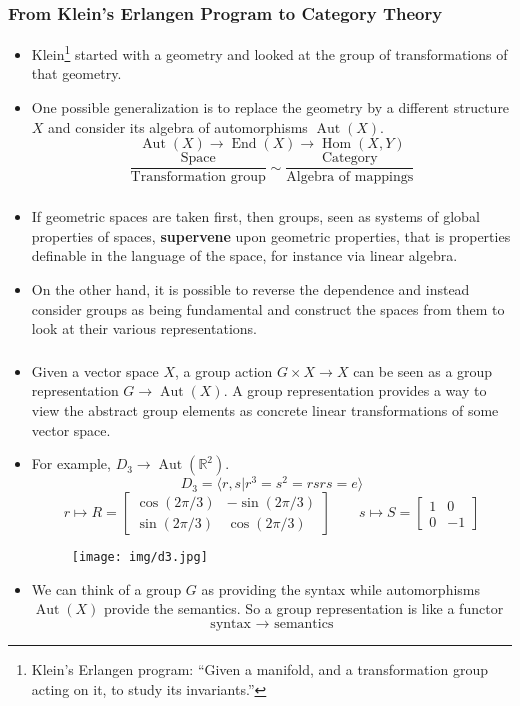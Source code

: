 \documentclass[UTF8,11pt,colorlinks,compress,openany]{beamer}%
\begin{document}
\begin{frame}\frametitle{From Klein's Erlangen Program to Category Theory}
\begin{itemize}
	\item Klein\footnote{Klein's Erlangen program: ``Given a manifold, and a transformation group acting on it, to study its invariants.''} started with a geometry and looked at the group of transformations of that geometry.
	\item One possible generalization is to replace the geometry by a different structure $X$ and consider its algebra of automorphisms $\operatorname{Aut}(X)$.
	\[\operatorname{Aut}(X)\to \operatorname{End}(X)\to \operatorname{Hom}(X,Y)\]
	\[\dfrac{\text{Space}}{\text{Transformation group}} \sim \dfrac{\text{Category}}{\text{Algebra of mappings}}\]
\end{itemize}
\end{frame}

\begin{frame}\frametitle{}
\begin{itemize}
	\item If geometric spaces are taken first, then groups, seen as systems of global properties of spaces, \textbf{supervene} upon geometric properties, that is properties definable in the language of the space, for instance via linear algebra.
	\item On the other hand, it is possible to reverse the dependence and instead consider groups as being fundamental and construct the spaces from them to look at their various representations.
\end{itemize}
\end{frame}

\begin{frame}\frametitle{}
\begin{itemize}
	\item Given a vector space $X$, a group action $G\times X\to X$ can be seen as a group representation $G\to \operatorname{Aut}(X)$. A group representation provides a way to view the abstract group elements as concrete linear transformations of some vector space.
	\item For example, $D_3\to\operatorname{Aut}(\mathbb{R}^2)$.
\[D_3=\langle r,s|r^3=s^2=rsrs=e\rangle\]
\[r\mapsto R=
\begin{bmatrix}
	\cos(2\pi/3) & -\sin(2\pi/3)\\
	\sin(2\pi/3) & \cos(2\pi/3)
\end{bmatrix}\qquad
s\mapsto S=
\begin{bmatrix}
	1 & 0\\
	0 & -1
\end{bmatrix}
\]
\begin{figure}[H]
	\texttt{[image: img/d3.jpg]}
\end{figure}
	\item We can think of a group $G$ as providing the syntax while automorphisms $\operatorname{Aut}(X)$ provide the semantics. So a group representation is like a functor
\[\mbox{syntax } \to \mbox{ semantics}\]
\end{itemize}
\end{frame}
\end{document}
